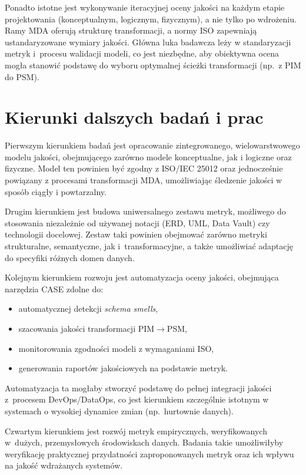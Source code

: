Ponadto istotne jest wykonywanie iteracyjnej oceny jakości na każdym etapie projektowania (konceptualnym, logicznym, fizycznym), a nie tylko po wdrożeniu. Ramy MDA oferują strukturę transformacji, a normy ISO zapewniają ustandaryzowane wymiary jakości. Główna luka badawcza leży w standaryzacji metryk i~procesu walidacji modeli, co jest niezbędne, aby obiektywna ocena mogła stanowić podstawę do wyboru optymalnej ścieżki transformacji (np.\ z PIM do PSM).

\section{Kierunki dalszych badań i prac}

Pierwszym kierunkiem badań jest opracowanie zintegrowanego, wielowarstwowego modelu jakości, obejmującego zarówno modele konceptualne, jak i logiczne oraz fizyczne. Model ten powinien być zgodny z ISO/IEC 25012 oraz jednocześnie powiązany z procesami transformacji MDA, umożliwiając śledzenie jakości w sposób ciągły i powtarzalny.

Drugim kierunkiem jest budowa uniwersalnego zestawu metryk, możliwego do stosowania niezależnie od używanej notacji (ERD, UML, Data Vault) czy technologii docelowej. Zestaw taki powinien obejmować zarówno metryki strukturalne, semantyczne, jak i~transformacyjne, a także umożliwiać adaptację do specyfiki różnych domen danych.

Kolejnym kierunkiem rozwoju jest automatyzacja oceny jakości, obejmująca narzędzia CASE zdolne do:
\begin{itemize}
  \item automatycznej detekcji \emph{schema smells},
  \item szacowania jakości transformacji PIM$\rightarrow$PSM,
  \item monitorowania zgodności modeli z wymaganiami ISO,
  \item generowania raportów jakościowych na podstawie metryk.
\end{itemize}

Automatyzacja ta mogłaby stworzyć podstawę do pełnej integracji jakości z~procesem DevOps/DataOps, co jest kierunkiem szczególnie istotnym w systemach o wysokiej dynamice zmian (np.\ hurtownie danych).

Czwartym kierunkiem jest rozwój metryk empirycznych, weryfikowanych w~dużych, przemysłowych środowiskach danych. Badania takie umożliwiłyby weryfikację praktycznej przydatności zaproponowanych metryk oraz ich wpływu na jakość wdrażanych systemów.

